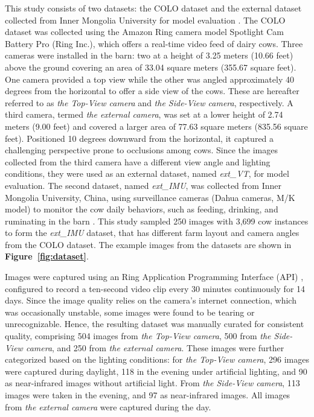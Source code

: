 This study consists of two datasets: the COLO dataset and the external dataset collected from Inner Mongolia University for model evaluation \citep{li_new_2024}. The COLO dataset was collected using the Amazon Ring camera model Spotlight Cam Battery Pro (Ring Inc.), which offers a real-time video feed of dairy cows. Three cameras were installed in the barn: two at a height of 3.25 meters (10.66 feet) above the ground covering an area of 33.04 square meters (355.67 square feet). One camera provided a top view while the other was angled approximately 40 degrees from the horizontal to offer a side view of the cows. These are hereafter referred to as \textit{the Top-View camera} and \textit{the Side-View camera}, respectively. A third camera, termed \textit{the external camera}, was set at a lower height of 2.74 meters (9.00 feet) and covered a larger area of 77.63 square meters (835.56 square feet). Positioned 10 degrees downward from the horizontal, it captured a challenging perspective prone to occlusions among cows. Since the images collected from the third camera have a different view angle and lighting conditions, they were used as an external dataset, named \textit{ext\_VT}, for model evaluation. The second dataset, named \textit{ext\_IMU}, was collected from Inner Mongolia University, China, using surveillance cameras (Dahua cameras, M/K model) to monitor the cow daily behaviors, such as feeding, drinking, and ruminating in the barn \citep{li_new_2024}. This study sampled 250 images with 3,699 cow instances to form the \textit{ext\_IMU} dataset, that has different farm layout and camera angles from the COLO dataset. The example images from the datasets are shown in \textbf{Figure~\ref{fig:dataset}}. 

Images were captured using an Ring Application Programming Interface (API) \cite{greif_dgreifring_2024}, configured to record a ten-second video clip every 30 minutes continuously for 14 days. Since the image quality relies on the camera's internet connection, which was occasionally unstable, some images were found to be tearing or unrecognizable. Hence, the resulting dataset was manually curated for consistent quality, comprising 504 images from \textit{the Top-View camera}, 500 from \textit{the Side-View camera}, and 250 from \textit{the external camera}. These images were further categorized based on the lighting conditions: for \textit{the Top-View camera}, 296 images were captured during daylight, 118 in the evening under artificial lighting, and 90 as near-infrared images without artificial light. From \textit{the Side-View camera}, 113 images were taken in the evening, and 97 as near-infrared images. All images from \textit{the external camera} were captured during the day.

